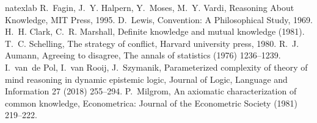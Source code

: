 \documentclass[twocolumn,a4paper,superscriptaddress,nofootinbib]{revtex4}
\newcommand{\tobo}[1]{{\color{red} TOBO: #1}}
\begin{document}



\if{} 
\begin{thebibliography}{71}
\expandafter\ifx\csname natexlab\endcsname\relax\def\natexlab#1{#1}\fi
\providecommand{\bibinfo}[2]{#2}
\ifx\xfnm\relax \def\xfnm[#1]{\unskip,\space#1}\fi
\bibinfo{author}{R.~Fagin}, \bibinfo{author}{J.~Y. Halpern},
  \bibinfo{author}{Y.~Moses}, \bibinfo{author}{M.~Y. Vardi},
  \bibinfo{title}{Reasoning About Knowledge}, \bibinfo{publisher}{MIT Press},
  \bibinfo{year}{1995}.
\bibinfo{author}{D.~Lewis}, \bibinfo{title}{Convention: A Philosophical Study},
  \bibinfo{year}{1969}.
\bibinfo{author}{H.~H. Clark}, \bibinfo{author}{C.~R. Marshall},
\newblock \bibinfo{title}{Definite knowledge and mutual knowledge}
  (\bibinfo{year}{1981}).
\bibinfo{author}{T.~C. Schelling}, \bibinfo{title}{The strategy of conflict},
  \bibinfo{publisher}{Harvard university press}, \bibinfo{year}{1980}.
\bibinfo{author}{R.~J. Aumann},
\newblock \bibinfo{title}{Agreeing to disagree},
\newblock \bibinfo{journal}{The annals of statistics}  (\bibinfo{year}{1976})
  \bibinfo{pages}{1236--1239}.
\bibinfo{author}{I.~van~de Pol}, \bibinfo{author}{I.~van Rooij},
  \bibinfo{author}{J.~Szymanik},
\newblock \bibinfo{title}{Parameterized complexity of theory of mind reasoning
  in dynamic epistemic logic},
\newblock \bibinfo{journal}{Journal of Logic, Language and Information}
  \bibinfo{volume}{27} (\bibinfo{year}{2018}) \bibinfo{pages}{255--294}.
\bibinfo{author}{P.~Milgrom},
\newblock \bibinfo{title}{An axiomatic characterization of common knowledge},
\newblock \bibinfo{journal}{Econometrica: Journal of the Econometric Society}
  (\bibinfo{year}{1981}) \bibinfo{pages}{219--222}.

\end{thebibliography}
\end{document}
